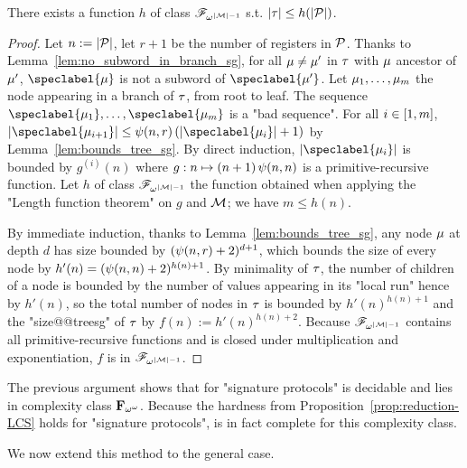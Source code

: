 \begin{proposition}
\label{prop:bounded_witness_sg}
There exists a function $h$ of class $\mathscr{F}_{\omega^{|\mathcal{M}|-1}}$ s.t. $|\tau| \leq h(|\mathcal{P}|)$. 
\end{proposition}
\begin{proof}
Let $n := |\mathcal{P}|$, let $r+1$ be the number of registers in $\mathcal{P}$. Thanks to Lemma~\ref{lem:no_subword_in_branch_sg}, for all $\mu \ne \mu'$ in 
$\tau$ with $\mu$ ancestor of $\mu'$, $\speclabel{\node}$ is not a subword of $\speclabel{\node'}$.  Let $\mu_1, \dots, \mu_m$ the node appearing in a branch of $\tau$, from root to leaf. The sequence $\speclabel{\node_1}, \dots, \speclabel{\node_m}$ is a "bad sequence".
For all $i \in [1,m]$, $\size{\speclabel{\node_{i+1}}}  \leq \towerfun(n,r) \, (\size{\speclabel{\node_i}}+1)$ by Lemma~\ref{lem:bounds_tree_sg}. By direct induction, $\size{\speclabel{\node_i}}$ is bounded by $g^{(i)}(n)$ where $g: n \mapsto (n+1)  \, \psi(n,n)$ is a primitive-recursive function. Let $h$ of class $\mathscr{F}_{\omega^{|\mathcal{M}|-1}}$ the function obtained when applying the "Length function theorem" on $g$ and $\mathcal{M}$; we have $m \leq h(n)$. 

By immediate induction, thanks to Lemma~\ref{lem:bounds_tree_sg}, any node $\mu$ at depth $d$ has size bounded by $(\psi(n,r)+2)^{d+1}$, which bounds the size of every node by $h'(n) = (\psi(n,n)+2)^{h(n) + 1}$. 
By minimality of $\tau$, the number of children of a node is bounded by the number of values appearing in its "local run" hence by $h'(n)$, so the total number of nodes in $\tau$ is bounded by $h'(n)^{h(n)+1}$ and the "size@@treesg" of $\tau$ by $f(n) := h'(n)^{h(n)+2}$. Because $\mathscr{F}_{\omega^{|\mathcal{M}|-1}}$ contains all primitive-recursive functions and is closed under multiplication and exponentiation, $f$ is in $\mathscr{F}_{\omega^{|\mathcal{M}|-1}}$.
\end{proof}

The previous argument shows that \COVER for "signature protocols" is decidable and lies in complexity class $\mathbf{F}_{\omega^\omega}$. Because the hardness from Proposition~\ref{prop:reduction-LCS} holds for "signature protocols", \COVER is in fact complete for this complexity class.

We now extend this method to the general case. 


